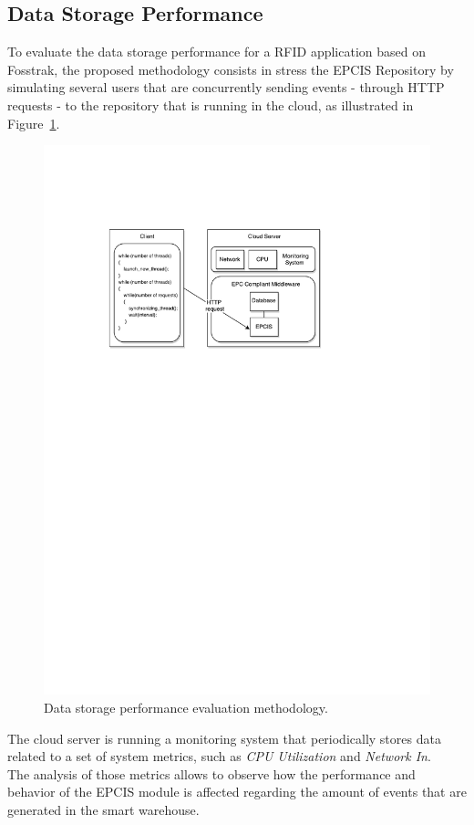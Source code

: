 \subsection{Data Storage Performance}
\label{sub:eval_methodology_data}
To evaluate the data storage performance for a \gls{RFID} application based on Fosstrak, the proposed
methodology consists in stress the \gls{EPCIS} Repository by simulating several users that are
concurrently sending events - through \gls{HTTP} requests - to the repository that is
running in the cloud, as illustrated in Figure~\ref{fig:eval_data_methodology}.

\begin{figure}[ht!]
  \centering
  \includegraphics[width=.7\textwidth]{./images/eval_data_methodology}
  \caption[Data storage evaluation methodology.]{Data storage performance evaluation methodology.}
  \label{fig:eval_data_methodology}
\end{figure}

The cloud server is running a monitoring system that periodically stores data related to a set of
system metrics, such as \textit{CPU Utilization} and \textit{Network In}.\\

The analysis of those metrics allows to observe how the performance and behavior of the \gls{EPCIS}
module is affected regarding the amount of events that are generated in the smart warehouse.

